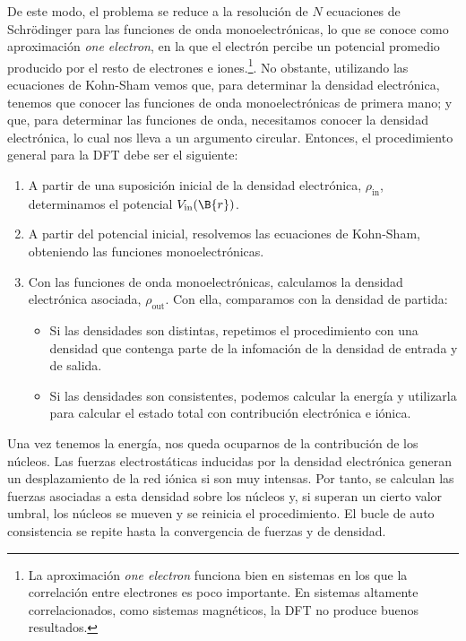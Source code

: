 De este modo, el problema se reduce a la resolución de $N$ ecuaciones de Schrödinger para las funciones de onda monoelectrónicas, lo que se conoce como aproximación \emph{one electron}, en la que el electrón percibe un potencial promedio producido por el resto de electrones e iones.\footnote{La aproximación \emph{one electron} funciona bien en sistemas en los que la correlación entre electrones es poco importante. En sistemas altamente correlacionados, como sistemas magnéticos, la DFT no produce buenos resultados.}. No obstante, utilizando las ecuaciones de Kohn-Sham vemos que, para determinar la densidad electrónica, tenemos que conocer las funciones de onda monoelectrónicas de primera mano; y que, para determinar las funciones de onda, necesitamos conocer la densidad electrónica, lo cual nos lleva a un argumento circular. Entonces, el procedimiento general para la DFT debe ser el siguiente:

\begin{enumerate}
    \item A partir de una suposición inicial de la densidad electrónica, $\rho_\text{in}$, determinamos el potencial $V_\text{in}(\B{r})$.
    \item A partir del potencial inicial, resolvemos las ecuaciones de Kohn-Sham, obteniendo las funciones monoelectrónicas.
    \item Con las funciones de onda monoelectrónicas, calculamos la densidad electrónica asociada, $\rho_\text{out}$. Con ella, comparamos con la densidad de partida:
    \begin{itemize}
        \item Si las densidades son distintas, repetimos el procedimiento con una densidad que contenga parte de la infomación de la densidad de entrada y de salida. 
        \item Si las densidades son consistentes, podemos calcular la energía y utilizarla para calcular el estado total con contribución electrónica e iónica.
    \end{itemize}
\end{enumerate}
Una vez tenemos la energía, nos queda ocuparnos de la contribución de los núcleos. Las fuerzas electrostáticas inducidas por la densidad electrónica generan un desplazamiento de la red iónica si son muy intensas. Por tanto, se calculan las fuerzas asociadas a esta densidad sobre los núcleos y, si superan un cierto valor umbral, los núcleos se mueven y se reinicia el procedimiento. El bucle de auto consistencia se repite hasta la convergencia de fuerzas y de densidad. 

